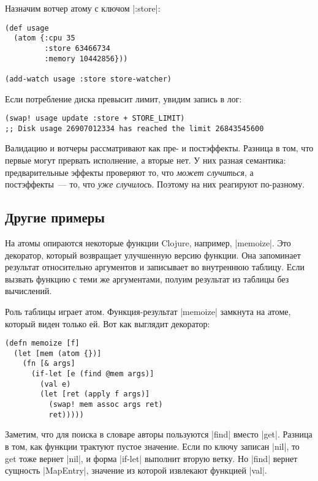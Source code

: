 Назначим вотчер атому с ключом \spverb|:store|:

\begin{verbatim}
(def usage
  (atom {:cpu 35
         :store 63466734
         :memory 10442856}))

(add-watch usage :store store-watcher)
\end{verbatim}

\noindent
Если потребление диска превысит лимит, увидим запись в лог:

\begin{verbatim}
(swap! usage update :store + STORE_LIMIT)
;; Disk usage 26907012334 has reached the limit 26843545600
\end{verbatim}

Валидацию и вотчеры рассматривают как пре- и постэффекты. Разница в том, что
первые могут прервать исполнение, а вторые нет. У них разная семантика:
предварительные эффекты проверяют то, что \emph{может случиться}, а
постэффекты~--- то, что \emph{уже случилось}. Поэтому на них реагируют
по-разному.

\subsection{Другие примеры}

На атомы опираются некоторые функции Clojure, например, \spverb|memoize|. Это
декоратор, который возвращает улучшенную версию функции. Она запоминает
результат относительно аргументов и записывает во внутреннюю таблицу. Если
вызвать функцию с теми же аргументами, полуим результат из таблицы без
вычислений.

Роль таблицы играет атом. Функция-результат \spverb|memoize| замкнута на атоме,
который виден только ей. Вот как выглядит декоратор:

\begin{verbatim}
(defn memoize [f]
  (let [mem (atom {})]
    (fn [& args]
      (if-let [e (find @mem args)]
        (val e)
        (let [ret (apply f args)]
          (swap! mem assoc args ret)
          ret)))))
\end{verbatim}

Заметим, что для поиска в словаре авторы пользуются \spverb|find| вместо
\spverb|get|. Разница в том, как функции трактуют пустое значение. Если по ключу
записан \spverb|nil|, то get тоже вернет \spverb|nil|, и форма \spverb|if-let|
выполнит вторую ветку. Но \spverb|find| вернет сущность \spverb|MapEntry|,
значение из которой извлекают функцией \spverb|val|.

